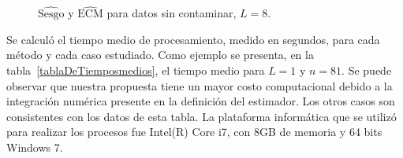 \begin{figure}[H]
	\centering
	\caption{\small $\widehat{\text{Sesgo}}$ y $\widehat{\text{ECM}}$ para datos sin contaminar, $L=8$.}
\end{figure}

Se calculó el tiempo medio de procesamiento, medido en segundos, para cada método y cada caso estudiado. Como  ejemplo se presenta, en la tabla~\ref{tablaDeTiemposmedios}, el tiempo medio para $L=1$ y $n=81$. Se puede observar que nuestra propuesta tiene un mayor costo computacional debido a la integración numérica presente en la definición del estimador. Los otros casos son consistentes con los datos de esta tabla. 
La plataforma informática que se utilizó para realizar los procesos fue Intel(R) Core i7, con 8GB de memoria y 64 bits Windows 7. 


